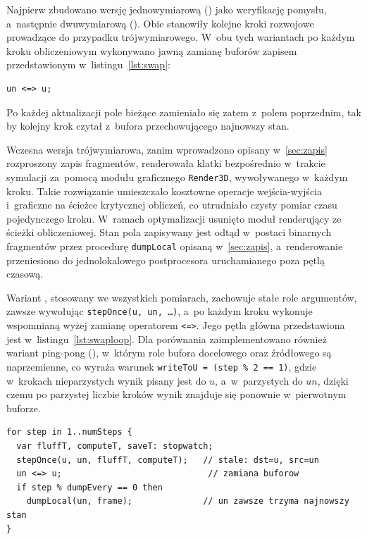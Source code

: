 Najpierw zbudowano wersję jednowymiarową () jako weryfikację pomysłu, a~następnie dwuwymiarową (). Obie stanowiły kolejne kroki rozwojowe prowadzące do przypadku trójwymiarowego. W~obu tych wariantach po każdym kroku obliczeniowym wykonywano jawną zamianę buforów zapisem przedstawionym w~listingu~\ref{lst:swap}:
\begin{lstlisting}[language=Chapel, caption={Zamiana buforów operatorem \texttt{<=>} stosowana w~wariantach 1D i~2D oraz w~wczesnej wersji 3D.}, label={lst:swap}]
  un <=> u;
\end{lstlisting}
Po każdej aktualizacji pole bieżące zamieniało się zatem z~polem poprzednim, tak by kolejny krok czytał z~bufora przechowującego najnowszy stan.

Wczesna wersja trójwymiarowa, zanim wprowadzono opisany w~\cref{sec:zapis} rozproszony zapis fragmentów, renderowała klatki bezpośrednio w~trakcie symulacji za~pomocą modułu graficznego \texttt{Render3D}, wywoływanego w~każdym kroku. Takie rozwiązanie umieszczało kosztowne operacje wejścia-wyjścia i~graficzne na ścieżce krytycznej obliczeń, co utrudniało czysty pomiar czasu pojedynczego kroku. 
W~ramach optymalizacji usunięto moduł renderujący ze ścieżki obliczeniowej. Stan pola zapisywany jest odtąd w~postaci binarnych fragmentów przez procedurę \texttt{dumpLocal} opisaną w~\cref{sec:zapis}, a~renderowanie przeniesiono do jednolokalowego postprocesora  uruchamianego poza pętlą czasową. 

Wariant , stosowany we wszystkich pomiarach, zachowuje stałe
role argumentów, zawsze wywołując \texttt{stepOnce(u, un, \ldots)}, a~po każdym
kroku wykonuje wspomnianą wyżej zamianę operatorem \texttt{<=>}. Jego pętla
główna przedstawiona jest w~listingu~\ref{lst:swaploop}. Dla porównania
zaimplementowano również wariant ping-pong (), w~którym role
bufora docelowego oraz źródłowego są naprzemienne, co wyraża warunek
\texttt{writeToU = (step \% 2 == 1)}, gdzie w~krokach nieparzystych wynik pisany jest
do \(u\), a~w~parzystych do \(un\), dzięki czemu po parzystej liczbie kroków
wynik znajduje się ponownie w~pierwotnym buforze.

\begin{lstlisting}[language=Chapel, caption={Pętla główna wariantu \texttt{3d.chpl}: stałe role buforów i~jawna zamiana operatorem \texttt{<=>} po każdym kroku.}, label={lst:swaploop}]
for step in 1..numSteps {
  var fluffT, computeT, saveT: stopwatch;
  stepOnce(u, un, fluffT, computeT);   // stale: dst=u, src=un
  un <=> u;                             // zamiana buforow
  if step % dumpEvery == 0 then
    dumpLocal(un, frame);              // un zawsze trzyma najnowszy stan
}
\end{lstlisting}

